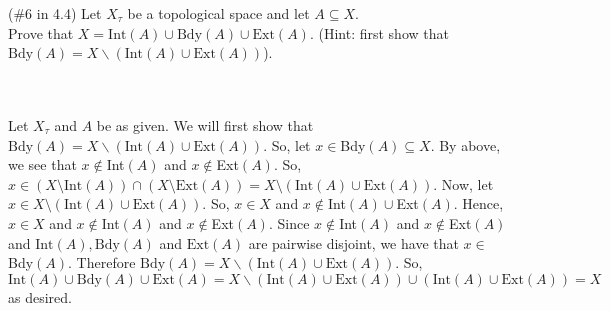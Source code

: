 (\#6 in 4.4) Let $X_{\tau}$ be a topological space and let $A\subseteq X$.\\
Prove that $X = \text{Int}(A)\cup \text{Bdy}(A) \cup \text{Ext}(A)$. (Hint: first show that
$\text{Bdy}(A)=X\backslash (\text{Int}(A)\cup \text{Ext}(A))$).\\\\

\begin{solution}\renewcommand{\qedsymbol}{}\ \\
    Let $X_{\tau}$ and $A$ be as given. We will first show that
    $\text{Bdy}(A)=X\backslash (\text{Int}(A)\cup \text{Ext}(A))$. So, let $x\in$Bdy$(A)\subseteq X$.
    By above, we see that $x\notin$Int$(A)$ and $x\notin$Ext$(A)$. So,
    $x\in(X\setminus\text{Int}(A))\cap(X\setminus\text{Ext}(A))=
    X\setminus(\text{Int}(A)\cup\text{Ext}(A))$. Now, let
    $x\in X\setminus(\text{Int}(A)\cup \text{Ext}(A))$. So, $x\in X$ and $x\notin$Int$(A)\cup$Ext$(A)$.
    Hence, $x\in X$ and $x\notin$Int$(A)$ and $x\notin$Ext$(A)$. Since $x\notin$Int$(A)$ and
    $x\notin$Ext$(A)$ and $\text{Int}(A), \text{Bdy}(A)$ and $\text{Ext}(A)$ are pairwise disjoint, we
    have that $x\in$Bdy$(A)$. Therefore $\text{Bdy}(A)=X\backslash (\text{Int}(A)\cup \text{Ext}(A))$.
    So,
    $\text{Int}(A)\cup \text{Bdy}(A) \cup \text{Ext}(A)=X\backslash(\text{Int}(A)\cup \text{Ext}(A))
    \cup(\text{Int}(A)\cup \text{Ext}(A))=X$ as desired.

\end{solution}